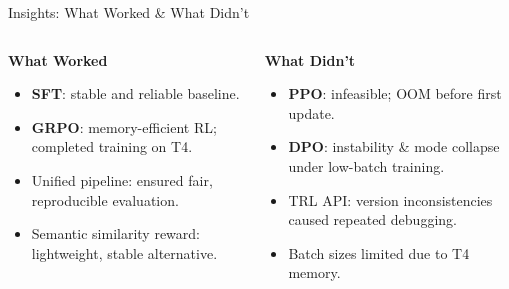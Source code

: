 \documentclass[10pt]{beamer}
\begin{document}
\begin{frame}{Insights: What Worked \& What Didn't}
\large

\begin{columns}


\begin{block}{\textbf{What Worked}}
\vspace{0.2cm}
\begin{itemize}
    \item \textbf{SFT}: stable and reliable baseline.
    \item \textbf{GRPO}: memory-efficient RL; completed training on T4.
    \item Unified pipeline: ensured fair, reproducible evaluation.
    \item Semantic similarity reward: lightweight, stable alternative.
\end{itemize}
\end{block}


\begin{block}{\textbf{What Didn't}}
\vspace{0.2cm}
\begin{itemize}
    \item \textbf{PPO}: infeasible; OOM before first update.
    \item \textbf{DPO}: instability \& mode collapse under low-batch training.
    \item TRL API: version inconsistencies caused repeated debugging.
    \item Batch sizes limited due to T4 memory.
\end{itemize}
\end{block}

\end{columns}

\end{frame}
\end{document}
